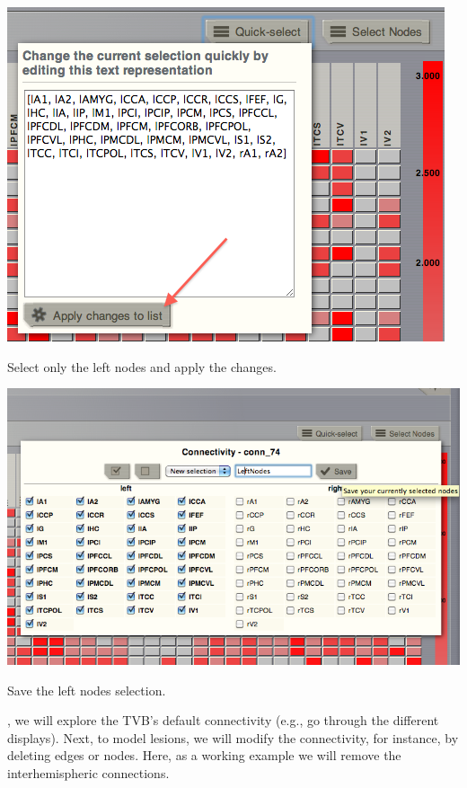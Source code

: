 \documentclass{tufte-handout}
\begin{document}
\begin{marginfigure}%
  \includegraphics[width=\linewidth]{Handout_UI_ModellingStructuralLesions_QuickSelectApplyChanges}%
  \caption{Select only the left nodes and apply the changes.}%
  \label{fig:quickselect_applychanges}%
\end{marginfigure}%

\begin{marginfigure}%
  \includegraphics[width=\linewidth]{Handout_UI_ModellingStructuralLesions_SaveLeftNodes}%
  \caption{Save the left nodes selection.}%
  \label{fig:saveleftnodes}%
\end{marginfigure}%
, we will explore the TVB's default connectivity (e.g., go through
the different displays). Next, to model lesions, we will modify the connectivity, for
instance, by deleting edges or nodes. Here, as a working example we will remove the
interhemispheric connections. 
\end{document}
